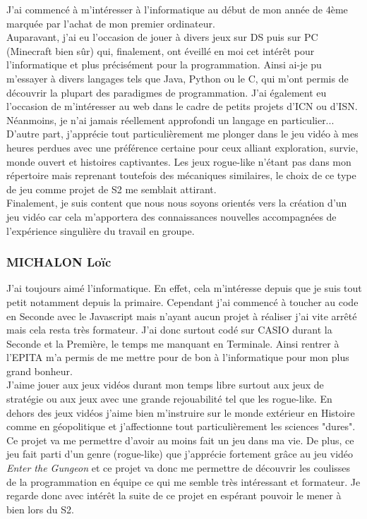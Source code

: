 \documentclass{article}
\begin{document}
J'ai commencé à m'intéresser à l'informatique au début de mon année de 4ème marquée par l'achat de mon premier ordinateur. \\
Auparavant, j'ai eu l'occasion de jouer à divers jeux sur DS puis sur PC (Minecraft bien sûr) qui, finalement, ont éveillé en moi cet intérêt pour l'informatique et plus précisément pour la programmation.
Ainsi ai-je pu m'essayer à divers langages tels que Java, Python ou le C, qui m'ont permis de découvrir la plupart des paradigmes de programmation. J'ai également eu l'occasion de m'intéresser au web dans le cadre de petits projets d'ICN ou d'ISN. \\
Néanmoins, je n'ai jamais réellement approfondi un langage en particulier... \\
D'autre part, j'apprécie tout particulièrement me plonger dans le jeu vidéo à mes heures perdues avec une préférence certaine pour ceux alliant exploration, survie, monde ouvert et histoires captivantes. Les jeux rogue-like n'étant pas dans mon répertoire mais reprenant toutefois des mécaniques similaires, le choix de ce type de jeu comme projet de S2 me semblait attirant. \\
Finalement, je suis content que nous nous soyons orientés vers la création d'un jeu vidéo car cela m'apportera des connaissances nouvelles accompagnées de l'expérience singulière du travail en groupe.

\subsubsection{MICHALON Loïc}

J'ai toujours aimé l'informatique. En effet, cela m'intéresse depuis que je suis tout petit notamment depuis la primaire. Cependant j'ai commencé à toucher au code en Seconde avec le Javascript mais n'ayant aucun projet à réaliser j'ai vite arrêté mais cela resta très formateur. J'ai donc surtout codé sur CASIO durant la Seconde et la Première, le temps me manquant en Terminale. Ainsi rentrer à l'EPITA m'a permis de me mettre pour de bon à l'informatique pour mon plus grand bonheur. \\
J'aime jouer aux jeux vidéos durant mon temps libre surtout aux jeux de stratégie ou aux jeux avec une grande rejouabilité tel que les rogue-like. En dehors des jeux vidéos j'aime bien m'instruire sur le monde extérieur en Histoire comme en géopolitique et j'affectionne tout particulièrement les sciences "dures". \\
Ce projet va me permettre d'avoir au moins fait un jeu dans ma vie. De plus, ce jeu fait parti d'un genre (rogue-like) que j'apprécie fortement grâce au jeu vidéo \textit{Enter the Gungeon} et ce projet va donc me permettre de découvrir les coulisses de la programmation en équipe ce qui me semble très intéressant et formateur. Je regarde donc avec intérêt la suite de ce projet en espérant pouvoir le mener à bien lors du S2.
\end{document}
